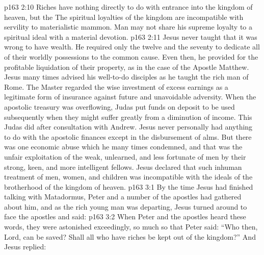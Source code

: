 \vs p163 2:10 Riches have nothing directly to do with entrance into the kingdom of heaven, but the  The spiritual loyalties of the kingdom are incompatible with servility to materialistic mammon. Man may not share his supreme loyalty to a spiritual ideal with a material devotion.
\vs p163 2:11 Jesus never taught that it was wrong to have wealth. He required only the twelve and the seventy to dedicate all of their worldly possessions to the common cause. Even then, he provided for the profitable liquidation of their property, as in the case of the Apostle Matthew. Jesus many times advised his well\hyp{}to\hyp{}do disciples as he taught the rich man of Rome. The Master regarded the wise investment of excess earnings as a legitimate form of insurance against future and unavoidable adversity. When the apostolic treasury was overflowing, Judas put funds on deposit to be used subsequently when they might suffer greatly from a diminution of income. This Judas did after consultation with Andrew. Jesus never personally had anything to do with the apostolic finances except in the disbursement of alms. But there was one economic abuse which he many times condemned, and that was the unfair exploitation of the weak, unlearned, and less fortunate of men by their strong, keen, and more intelligent fellows. Jesus declared that such inhuman treatment of men, women, and children was incompatible with the ideals of the brotherhood of the kingdom of heaven.
\vs p163 3:1 By the time Jesus had finished talking with Matadormus, Peter and a number of the apostles had gathered about him, and as the rich young man was departing, Jesus turned around to face the apostles and said: 
\vs p163 3:2 When Peter and the apostles heard these words, they were astonished exceedingly, so much so that Peter said: “Who then, Lord, can be saved? Shall all who have riches be kept out of the kingdom?” And Jesus replied: 
